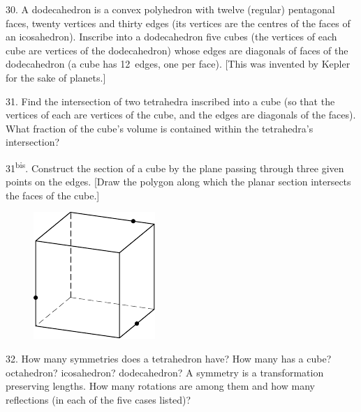 \begin{problem}{30.}
	A dodecahedron is a convex polyhedron with twelve (regular) pentagonal
	faces, twenty vertices
	and thirty edges (its vertices are the centres of the faces of an icosahedron).
	Inscribe into a dodecahedron five cubes (the vertices of each cube are vertices of the dodecahedron)
	whose edges are diagonals of faces of the dodecahedron (a cube has 12~edges, one per face).
	[This was invented by Kepler for the sake of planets.]
\end{problem}

\begin{problem}{31.}
	Find the intersection of two tetrahedra inscribed into a cube (so that the vertices of each are
	vertices of the cube, and the edges are diagonals of the faces).
	What fraction of the cube's volume is contained within the tetrahedra's intersection?
\end{problem}

\begin{problem}{31\textsuperscript{bis}.}
	Construct the section of a cube by the plane passing through three given points on the edges.
	[Draw the polygon along which the planar section intersects the faces of the cube.]
	\begin{figure}
		\includegraphics{resources/taskbook-15}
	\end{figure}
\end{problem}

\begin{problem}{32.}
	How many symmetries does a tetrahedron have? How many has a cube? octahedron? icosahedron?
	dodecahedron? A symmetry is a transformation preserving lengths.
	How many rotations are among them and how many reflections (in each of the five cases listed)?
\end{problem}

